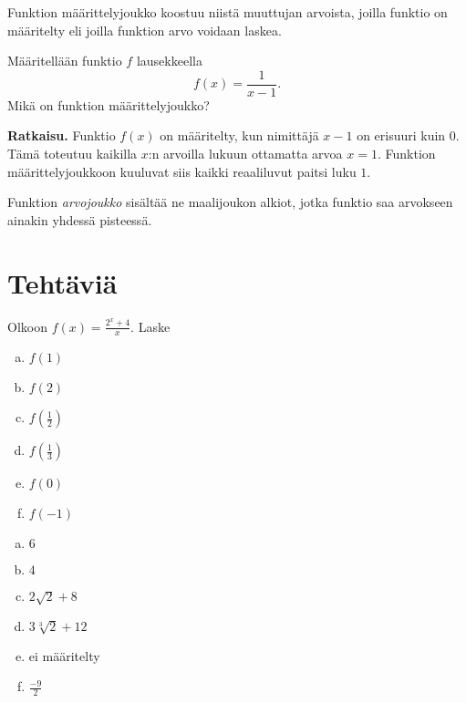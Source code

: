 Funktion määrittelyjoukko koostuu niistä muuttujan arvoista, joilla
funktio on määritelty eli joilla funktion arvo voidaan laskea.

\begin{esimerkki}
Määritellään funktio $f$ lausekkeella
\[
f(x) = \frac{1}{x-1}.
\]
Mikä on funktion määrittelyjoukko?

\textbf{Ratkaisu.}
Funktio $f(x)$ on määritelty, kun nimittäjä $x-1$ on erisuuri
kuin 0. Tämä toteutuu kaikilla $x$:n arvoilla lukuun ottamatta
arvoa $x = 1$. Funktion määrittelyjoukkoon kuuluvat siis
kaikki reaaliluvut paitsi luku $1$.
\end{esimerkki}

Funktion \emph{arvojoukko} sisältää ne maalijoukon alkiot,
jotka funktio saa arvokseen ainakin yhdessä pisteessä.



\section*{Tehtäviä}
\begin{tehtava}
Olkoon $f(x)=\frac{2^x+4}{x}$. Laske
\begin{enumerate}[a)]
\item $f(1)$
\item $f(2)$
\item $f(\frac{1}{2})$
\item $f(\frac{1}{3})$
\item $f(0)$
\item $f(-1)$
\end{enumerate}
\begin{vastaus}
\begin{enumerate}[a)]
\item $6$
\item $4$
\item $2\sqrt{2}+8$
\item $3\sqrt[3]{2}+12$
\item ei määritelty
\item $\frac{-9}{2}$
\end{enumerate}
\end{vastaus}
\end{tehtava}

